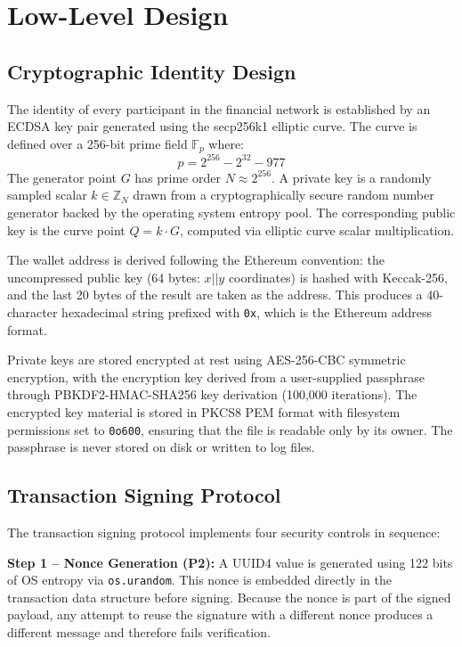 \documentclass[12pt,a4paper]{report}
\begin{document}
\section{Low-Level Design}

\subsection{Cryptographic Identity Design}

The identity of every participant in the financial network is established by an ECDSA
key pair generated using the secp256k1 elliptic curve. The curve is defined over a 256-bit
prime field $\mathbb{F}_p$ where:
\[
  p = 2^{256} - 2^{32} - 977
\]
The generator point $G$ has prime order $N \approx 2^{256}$. A private key is a randomly
sampled scalar $k \in \mathbb{Z}_N$ drawn from a cryptographically secure random number
generator backed by the operating system entropy pool. The corresponding public key is the
curve point $Q = k \cdot G$, computed via elliptic curve scalar multiplication.

The wallet address is derived following the Ethereum convention: the uncompressed public
key (64 bytes: $x || y$ coordinates) is hashed with Keccak-256, and the last 20 bytes of
the result are taken as the address. This produces a 40-character hexadecimal string
prefixed with \texttt{0x}, which is the Ethereum address format.

Private keys are stored encrypted at rest using AES-256-CBC symmetric encryption, with
the encryption key derived from a user-supplied passphrase through PBKDF2-HMAC-SHA256 key
derivation (100,000 iterations). The encrypted key material is stored in PKCS8 PEM format
with filesystem permissions set to \texttt{0o600}, ensuring that the file is readable only
by its owner. The passphrase is never stored on disk or written to log files.

\subsection{Transaction Signing Protocol}

The transaction signing protocol implements four security controls in sequence:

\textbf{Step 1 -- Nonce Generation (P2):} A UUID4 value is generated using 122 bits of
OS entropy via \texttt{os.urandom}. This nonce is embedded directly in the transaction
data structure before signing. Because the nonce is part of the signed payload, any attempt
to reuse the signature with a different nonce produces a different message and therefore
fails verification.
\end{document}
